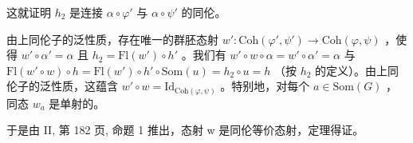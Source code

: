 这就证明 \(h_{2}\) 是连接 \(\alpha \circ \varphi'\) 与 \(\alpha \circ \psi'\) 的同伦。

由上同伦子的泛性质，存在唯一的群胚态射 \(w'\colon \mathrm{Coh}(\varphi', \psi') \to \mathrm{Coh}(\varphi, \psi)\) ，使得 \(w' \circ \alpha' = \alpha\) 且 \(h_2 = \mathrm{Fl}(w') \circ h'\) 。我们有 \(w' \circ w \circ \alpha = w' \circ \alpha' = \alpha\) 与 \(\mathrm{Fl}(w' \circ w) \circ h = \mathrm{Fl}(w') \circ h' \circ \mathrm{Som}(u) = h_2 \circ u = h\) （按 \(h_2\) 的定义）。由上同伦子的泛性质，这蕴含 \(w' \circ w = \mathrm{Id}_{\mathrm{Coh}(\varphi, \psi)}\) 。特别地，对每个 \(a \in \mathrm{Som}(G)\) ，同态 \(w_a\) 是单射的。

于是由 II, 第 182 页, 命题 1 推出，态射 w 是同伦等价态射，定理得证。
